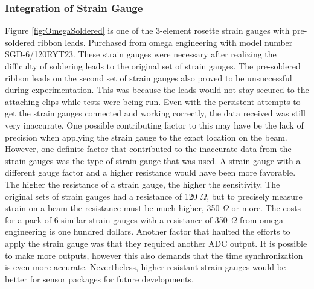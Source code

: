 
\subsubsection{Integration of Strain Gauge}

\indent Figure \ref{fig:OmegaSoldered} is one of the 3-element rosette strain gauges with pre-soldered ribbon leads. Purchased from omega engineering with
model number SGD-6/120RYT23. These strain gauges were necessary after realizing the difficulty of soldering leads to the original set of strain gauges.
The pre-soldered ribbon leads on the second set of strain gauges also proved to be unsuccessful during experimentation. This was because the leads would
not stay secured to the attaching clips while tests were being run. Even with the persistent attempts to get the strain gauges connected and working
correctly, the data received was still very inaccurate. One possible contributing factor to this may have be the lack of precision when applying the
strain gauge to the exact location on the beam. However, one definite factor that contributed to the inaccurate data from the strain gauges was the
type of strain gauge that was used. A strain gauge with a different gauge factor and a higher resistance would have been more favorable. The higher
the resistance of a strain gauge, the higher the sensitivity. The original sets of strain gauges had a resistance of 120 $\Omega$, but to precisely
measure strain on a beam the resistance must be much higher, 350 $\Omega$ or more. The costs for a pack of 6 similar strain gauges with a
resistance of 350 $\Omega$ from omega engineering is one hundred dollars. Another factor that haulted the efforts to apply the strain gauge was
that they required another ADC output. It is possible to make more outputs, however this also demands that the time synchronization is even more
accurate. Nevertheless, higher resistant strain gauges would be better for sensor packages for future developments. \\

